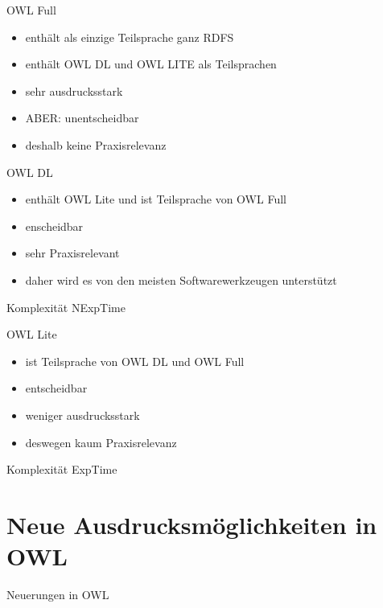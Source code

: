 \documentclass{beamer}
\begin{document}
%
\begin{frame}{OWL Full}
\begin{itemize}
	\item enthält als einzige Teilsprache \alert{ganz} RDFS
	\item enthält OWL DL und OWL LITE als Teilsprachen
	\item sehr ausdrucksstark
	\item ABER: \alert{unentscheidbar}
	\item deshalb keine Praxisrelevanz
\end{itemize}
\end{frame}

%
\begin{frame}{OWL DL}
\begin{itemize}
	\item enthält OWL Lite und ist Teilsprache von OWL Full
	\item enscheidbar
	\item sehr Praxisrelevant
	\item daher wird es von den meisten Softwarewerkzeugen unterstützt
\end{itemize}
\begin{block}{Komplexität}
	NExpTime
\end{block}
\end{frame}

%
\begin{frame}{OWL Lite}
\begin{itemize}
	\item ist Teilsprache von OWL DL und OWL Full
	\item entscheidbar
	\item weniger ausdrucksstark
	\item deswegen kaum Praxisrelevanz
\end{itemize}
\begin{block}{Komplexität}
	ExpTime
\end{block}
\end{frame}


\section{Neue Ausdrucksmöglichkeiten in OWL}
\begin{frame}{Neuerungen in OWL}

\end{frame}
\end{document}
